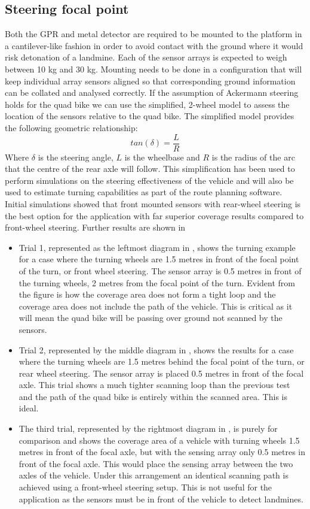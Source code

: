 \documentclass[main.tex]{subfiles}
\begin{document}
\subsection{Steering focal point}
Both the GPR and metal detector are required to be mounted to the platform in a cantilever-like fashion in order to avoid contact with the ground where it would risk detonation of a landmine. Each of the sensor arrays is expected to weigh between 10 kg and 30 kg.
Mounting needs to be done in a configuration that will keep individual array sensors aligned so that corresponding ground information can be collated and analysed correctly. If the assumption of Ackermann steering holds for the quad bike we can use the simplified, 2-wheel model to assess the location of the sensors relative to the quad bike. The simplified model provides the following geometric relationship:
$$
tan(\delta) = \frac{L}{R}
$$
Where $\delta$ is the steering angle, $L$ is the wheelbase and $R$ is the radius of the arc that the centre of the rear axle will follow. This simplification has been used to perform simulations on the steering effectiveness of the vehicle and will also be used to estimate turning capabilities as part of the route planning software.
Initial simulations showed that front mounted sensors with rear-wheel steering is the best option for the application with far superior coverage results compared to front-wheel steering. Further results are shown in 
\begin{itemize}
\item Trial 1, represented as the leftmost diagram in , shows the turning example for a case where the turning wheels are 1.5 metres in front of the focal point of the turn, or front wheel steering. The sensor array is 0.5 metres in front of the turning wheels, 2 metres from the focal point of the turn. Evident from the figure is how the coverage area does not form a tight loop and the coverage area does not include the path of the vehicle. This is critical as it will mean the quad bike will be passing over ground not scanned by the sensors.
\item Trial 2, represented by the middle diagram in , shows the results for a case where the turning wheels are 1.5 metres behind the focal point of the turn, or rear wheel steering. The sensor array is placed 0.5 metres in front of the focal axle. This trial shows a much tighter scanning loop than the previous test and the path of the quad bike is entirely within the scanned area. This is ideal.
\item The third trial, represented by the rightmost diagram in , is purely for comparison and shows the coverage area of a vehicle with turning wheels 1.5 metres in front of the focal axle, but with the sensing array only 0.5 metres in front of the focal axle. This would place the sensing array between the two axles of the vehicle. Under this arrangement an identical scanning path is achieved using a front-wheel steering setup. This is not useful for the application as the sensors must be in front of the vehicle to detect landmines.
\end{itemize}
\end{document}
